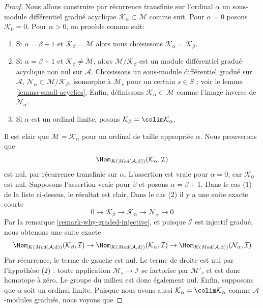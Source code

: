 \begin{proof}
\medskip\noindent
Nous allons construire par récurrence transfinie sur l'ordinal $\alpha$ un sous-module différentiel gradué acyclique $\mathcal{K}_\alpha \subset \mathcal{M}$ comme suit.
Pour $\alpha = 0$ posons $\mathcal{K}_0 = 0$.
Pour $\alpha > 0$, on procède comme suit:
\begin{enumerate}
\item Si $\alpha = \beta + 1$ et $\mathcal{K}_\beta = \mathcal{M}$ alors nous choisissons $\mathcal{K}_\alpha = \mathcal{K}_\beta$.
\item Si $\alpha = \beta + 1$ et $\mathcal{K}_\beta \not = \mathcal{M}$, alors $\mathcal{M}/\mathcal{K}_\beta$ est un module différentiel gradué acyclique non nul sur $\mathcal{A}$.
Choisissons un sous-module différentiel gradué sur $\mathcal{A}$, $\mathcal{N}_\alpha \subset \mathcal{M}/\mathcal{K}_\beta$, isomorphe à $\mathcal{M}_s$ pour un certain $s \in S$ ; voir le lemme \ref{lemma-small-acyclics}.
Enfin, définissons $\mathcal{K}_\alpha \subset \mathcal{M}$ comme l'image inverse de $\mathcal{N}_\alpha$.
\item Si $\alpha$ est un ordinal limite, posons $\mathcal{K}_\beta = \colim \mathcal{K}_\alpha$.
\end{enumerate}
Il est clair que $\mathcal{M} = \mathcal{K}_\alpha$ pour un ordinal de taille appropriée $\alpha$.
Nous prouverons que
$$
\Hom_{K(\textit{Mod}(\mathcal{A}, \text{d}))}(\mathcal{K}_\alpha, \mathcal{I})
$$
est nul, par récurrence transfinie sur $\alpha$.
L'assertion est vraie pour $\alpha = 0$, car $\mathcal{K}_0$ est nul.
Supposons l'assertion vraie pour $\beta$ et posons $\alpha = \beta + 1$.
Dans le cas (1) de la liste ci-dessus, le résultat est clair.
Dans le cas (2) il y a une suite exacte courte
$$
0 \to \mathcal{K}_\beta \to \mathcal{K}_\alpha \to \mathcal{N}_\alpha \to 0
$$
Par la remarque \ref{remark-why-graded-injective}, et puisque $\mathcal{I}$ est injectif gradué, nous obtenons une suite exacte
$$
\Hom_{K(\textit{Mod}(\mathcal{A}, \text{d}))}(\mathcal{K}_\beta, \mathcal{I})
\to
\Hom_{K(\textit{Mod}(\mathcal{A}, \text{d}))}(\mathcal{K}_\alpha, \mathcal{I})
\to
\Hom_{K(\textit{Mod}(\mathcal{A}, \text{d}))}(\mathcal{N}_\alpha, \mathcal{I})
$$
Par récurrence, le terme de gauche est nul.
Le terme de droite est nul par l'hypothèse (2) : toute application $\mathcal{M}_s \to \mathcal{I}$ se factorise par $\mathcal{M}'_s$ et est donc homotope à zéro.
Le groupe du milieu est donc également nul.
Enfin, supposons que $\alpha$ soit un ordinal limite.
Puisque nous avons aussi $\mathcal{K}_\alpha = \colim \mathcal{K}_\alpha$ comme $\mathcal{A}$-modules gradués, nous voyons que

\end{proof}
